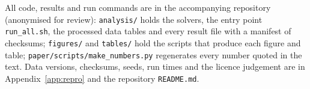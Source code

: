 All code, results and run commands are in the accompanying repository (anonymised for review): \texttt{analysis/} holds the solvers, the entry point \texttt{run\_all.sh}, the processed data tables and every result file with a manifest of checksums; \texttt{figures/} and \texttt{tables/} hold the scripts that produce each figure and table; \texttt{paper/scripts/make\_numbers.py} regenerates every number quoted in the text. Data versions, checksums, seeds, run times and the licence judgement are in Appendix~\ref{app:repro} and the repository \texttt{README.md}.
